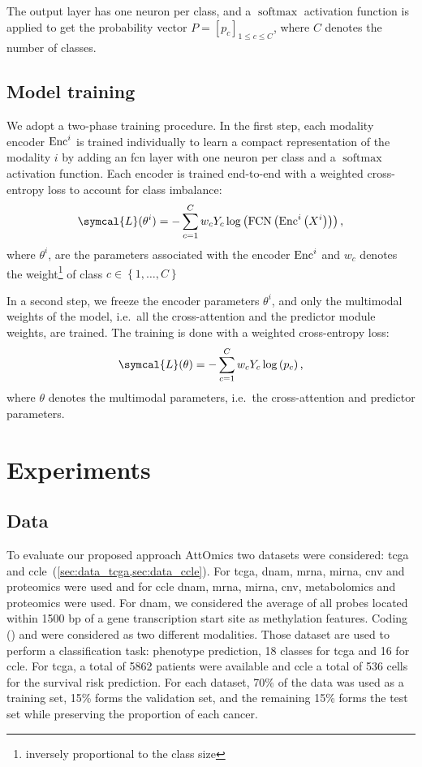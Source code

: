 \documentclass[../main.tex]{subfiles}
\begin{document}
		The output layer has one neuron per class, and a \(\operatorname{softmax}\) activation function is applied to get the probability vector \({P = {\left[p_c\right]}_{1\leq c\leq C}}\), where \(C\) denotes the number of classes.

	\subsection{Model training}
		We adopt a two-phase training procedure.
		In the first step, each modality encoder \(\operatorname{Enc}^i\) is trained individually to learn a compact representation of the modality \(i\) by adding an \gls{fcn} layer with one neuron per class and a \(\operatorname{softmax}\) activation function.
		Each encoder is trained end-to-end with a weighted cross-entropy loss to account for class imbalance:
		\begin{equation*}
			\symcal{L}(\theta^{i}) = - \sum_{c=1}^{C}w_c Y_c \log\left( \fcn\left(\enc^{i}\left(X^{i}\right)\right)\right) \text{,}
		\end{equation*}
		where \( \theta^{i}\), are the parameters associated with the encoder \(\operatorname{Enc}^{i}\) and \(w_c\) denotes the weight\footnote{inversely proportional to the class size} of class \(c \in \left\{1, \ldots,C \right\}\)

		In a second step, we freeze the encoder parameters \(\theta^i\), and only the multimodal weights of the model, i.e.\ all the cross-attention and the predictor module weights, are trained.
		The training is done with a weighted cross-entropy loss:
		\begin{equation*}
			\symcal{L}(\theta) = - \sum_{c=1}^{C}w_c Y_c \log\left( p_c\right) \text{,}
		\end{equation*}
		where \(\theta\) denotes the multimodal parameters, i.e.\ the cross-attention and predictor parameters.

\section{Experiments}
	\subsection{Data}
		To evaluate our proposed approach AttOmics two datasets were considered: \gls{tcga} and \gls{ccle}~(\cref{sec:data_tcga,sec:data_ccle}).
		For \gls{tcga}, \Gls{dnam}, \gls{mrna}, \gls{mirna}, \gls{cnv} and proteomics were used and for \gls{ccle} \gls{dnam}, \gls{mrna}, \gls{mirna}, \gls{cnv}, metabolomics and proteomics were used.
		For \gls{dnam}, we considered the average of all probes located within 1500 bp of a gene transcription start site as methylation features.
		Coding () and  were considered as two different modalities.
		Those dataset are used to perform a classification task: phenotype prediction, 18 classes for \gls{tcga} and 16 for \gls{ccle}.
		For \gls{tcga}, a total of 5862 patients were available and \gls{ccle} a total of 536 cells for the survival risk prediction.
		For each dataset, 70\% of the data was used as a training set, 15\% forms the validation set, and the remaining 15\% forms the test set while preserving the proportion of each cancer.
\end{document}
